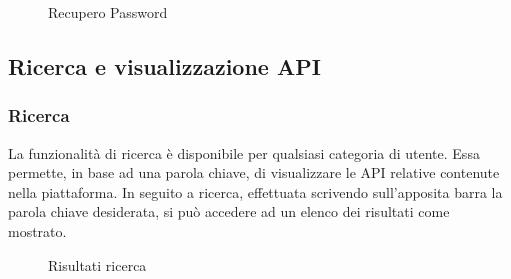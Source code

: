 	\label{Recupero Password}
	\begin{figure}[H]
		\centering
		\caption{Recupero Password}
	\end{figure}

\subsection{Ricerca e visualizzazione API}

\subsubsection{Ricerca}
La funzionalità di ricerca è disponibile per qualsiasi categoria di utente. Essa permette, in base ad una parola chiave, di visualizzare le API relative contenute nella piattaforma. In seguito a ricerca, effettuata scrivendo sull'apposita barra la parola chiave desiderata, si può accedere ad un elenco dei risultati come mostrato.

\label{Risultati ricerca}
\begin{figure}[H]
	\centering
	\caption{Risultati ricerca}
\end{figure}


